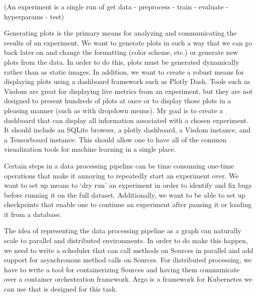 \documentclass[letterpaper,10pt,english]{sphinxmanual}
\begin{document}

(An experiment is a single run of get data - preprocess - train - evaluate - hyperparams - test)


Generating plots is the primary means for analyzing and communicating the results of an experiment. We want to generate plots in such a way that we can go back later on and change the formatting (color scheme, etc.) or generate new plots from the data. In order to do this, plots must be generated dynamically rather than as static images. In addition, we want to create a robust means for displaying plots using a dashboard framework such as Plotly Dash. Tools such as Visdom are great for displaying live metrics from an experiment, but they are not designed to present hundreds of plots at once or to display those plots in a pleasing manner (such as with dropdown menus).
My goal is to create a dashboard that can display all information associated with a chosen experiment. It should include an SQLite browser, a plotly dashboard, a Visdom instance, and a Tensorboard instance. This should allow one to have all of the common visualization tools for machine learning in a single place.


Certain steps in a data processing pipeline can be time consuming one-time operations that make it annoying to repeatedly start an experiment over. We want to set up means to ‘dry run’ an experiment in order to identify and fix bugs before running it on the full dataset. Additionally, we want to be able to set up checkpoints that enable one to continue an experiment after pausing it or loading it from a database.


The idea of representing the data processing pipeline as a graph can naturally scale to parallel and distributed environments. In order to do make this happen, we need to write a scheduler that can call methods on Sources in parallel and add support for asynchronous method calls on Sources. For distributed processing, we have to write a tool for containerizing Sources and having them communicate over a container orchestration framework. Argo is a framework for Kubernetes we can use that is designed for this task.

\end{document}

